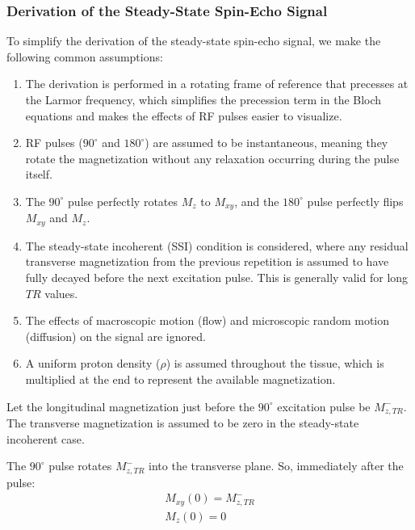 \documentclass[10pt,a4paper,twoside]{article}
\begin{document}
\subsubsection{Derivation of the Steady-State Spin-Echo Signal}
To simplify the derivation of the steady-state spin-echo signal, we make the following common assumptions:
\begin{enumerate}
    \item The derivation is performed in a rotating frame of reference that precesses at the Larmor frequency, which simplifies the precession term in the Bloch equations and makes the effects of RF pulses easier to visualize.
    \item RF pulses ($90^\circ$ and $180^\circ$) are assumed to be instantaneous, meaning they rotate the magnetization without any relaxation occurring during the pulse itself.
    \item The $90^\circ$ pulse perfectly rotates $M_z$ to $M_{xy}$, and the $180^\circ$ pulse perfectly flips $M_{xy}$ and $M_z$.
    \item The steady-state incoherent (SSI) condition is considered, where any residual transverse magnetization from the previous repetition is assumed to have fully decayed before the next excitation pulse. This is generally valid for long $TR$ values.
    \item The effects of macroscopic motion (flow) and microscopic random motion (diffusion) on the signal are ignored.
    \item A uniform proton density ($\rho$) is assumed throughout the tissue, which is multiplied at the end to represent the available magnetization.
\end{enumerate}

\vspace{12pt}

Let the longitudinal magnetization just before the $90^\circ$ excitation pulse be $M_{z,TR}^-$. The transverse magnetization is assumed to be zero in the steady-state incoherent case.

\vspace{12pt}

The $90^\circ$ pulse rotates $M_{z,TR}^-$ into the transverse plane. So, immediately after the pulse:
\begin{gather*}
M_{xy}(0) = M_{z,TR}^- \\
M_z(0) = 0
\end{gather*}

\vspace{12pt}
\end{document}
